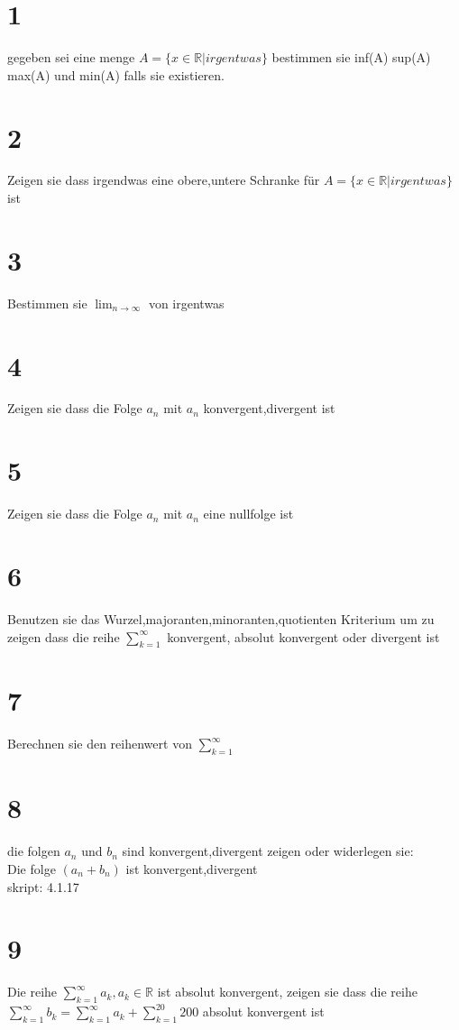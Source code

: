 \documentclass[11pt,oneside,a4paper]{scrartcl}
\begin{document}
\section*{1}
gegeben sei eine menge $A=\{x\in\mathbb{R}| irgentwas\}$ bestimmen sie inf(A) sup(A) max(A) und min(A) falls sie existieren.
\section*{2}
Zeigen sie dass irgendwas eine obere,untere Schranke f\"ur $A=\{x\in\mathbb{R}| irgentwas\}$ ist\\
\section*{3}
Bestimmen sie $\lim_{n\to\infty}$ von irgentwas%
\section*{4}
Zeigen sie dass die Folge $a_n$ mit $a_n$ konvergent,divergent ist
\section*{5}
Zeigen sie dass die Folge $a_n$ mit $a_n$ eine nullfolge ist
\section*{6}
Benutzen sie das Wurzel,majoranten,minoranten,quotienten Kriterium um zu zeigen dass die reihe $\sum^{\infty}_{k=1}$ konvergent, absolut konvergent oder divergent ist 
\section*{7}
Berechnen sie den reihenwert von  $\sum^{\infty}_{k=1}$
\section*{8}
die folgen $a_n$ und $b_n$ sind konvergent,divergent zeigen oder widerlegen sie:\\
Die folge $(a_n+b_n)$ ist konvergent,divergent\\
skript: 4.1.17
\section*{9}
Die reihe $\sum^{\infty}_{k=1}a_k,a_k\in\mathbb{R}$ ist absolut konvergent, zeigen sie dass die reihe $\sum^{\infty}_{k=1}b_k=\sum^{\infty}_{k=1}a_k+\sum^{20}_{k=1}200$ absolut konvergent ist
\end{document}

